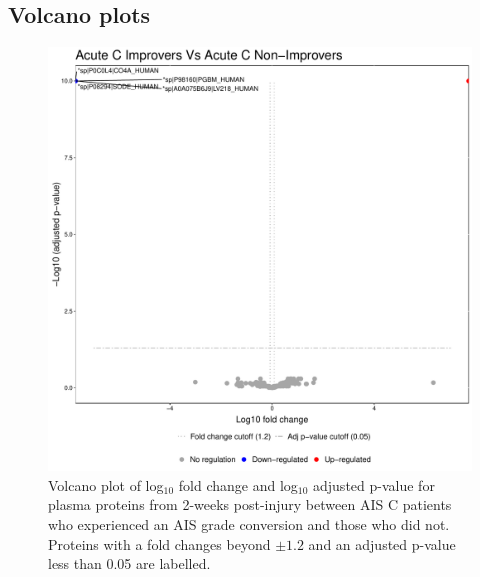 \documentclass[9pt,lineno]{elife}
\begin{document}
\begin{landscape}
\begin{landscape}
\begin{landscape}
\begin{landscape}
\clearpage

\hypertarget{sup-volc-plots}{%
\subsection{Volcano plots}\label{sup-volc-plots}}



\begin{figure}
\includegraphics[width=1\linewidth]{figures/openms_protein_quantification/label_free/volcano_plots/openms_volcano_plot_2021-08-10_0008} \caption{Volcano plot of log\(_10\) fold change and log\(_10\) adjusted p-value for plasma proteins from 2-weeks post-injury between AIS C patients who experienced an AIS grade conversion and those who did not. Proteins with a fold changes beyond \(\pm 1.2\) and an adjusted p-value less than 0.05 are labelled.}\label{fig:volc-plot-c-imp-vs-nonimp}
\end{figure}




\end{landscape}
\end{landscape}
\end{landscape}
\end{landscape}
\end{document}
